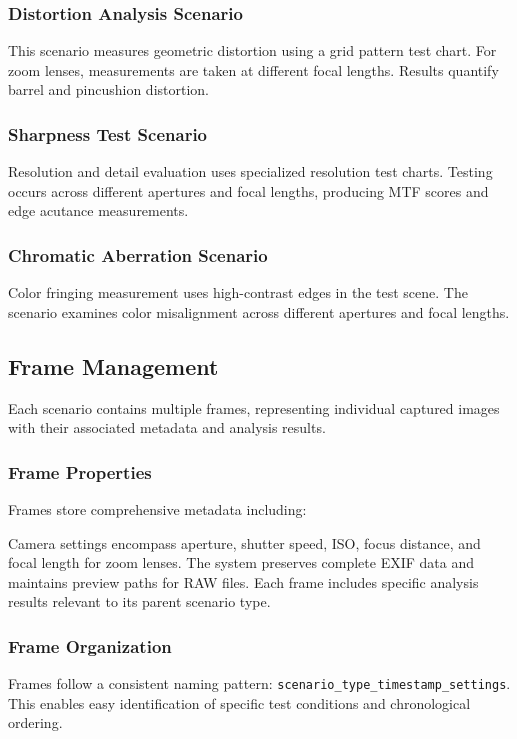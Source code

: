 \subsubsection{Distortion Analysis Scenario}
This scenario measures geometric distortion using a grid pattern test chart. For zoom lenses, measurements are taken at different focal lengths. Results quantify barrel and pincushion distortion.

\subsubsection{Sharpness Test Scenario}
Resolution and detail evaluation uses specialized resolution test charts. Testing occurs across different apertures and focal lengths, producing MTF scores and edge acutance measurements.

\subsubsection{Chromatic Aberration Scenario}
Color fringing measurement uses high-contrast edges in the test scene. The scenario examines color misalignment across different apertures and focal lengths.

\subsection{Frame Management}
Each scenario contains multiple frames, representing individual captured images with their associated metadata and analysis results.

\subsubsection{Frame Properties}
Frames store comprehensive metadata including:

Camera settings encompass aperture, shutter speed, ISO, focus distance, and focal length for zoom lenses. The system preserves complete EXIF data and maintains preview paths for RAW files. Each frame includes specific analysis results relevant to its parent scenario type.

\subsubsection{Frame Organization}
Frames follow a consistent naming pattern: \texttt{scenario\_type\_timestamp\_settings}. This enables easy identification of specific test conditions and chronological ordering.

